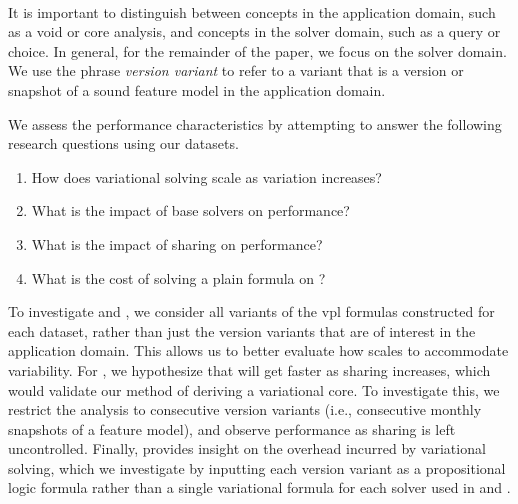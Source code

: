 ~\label{section:case-studies:experimental-methodology}

It is important to distinguish between concepts in the application domain, such
as a void or core analysis, and concepts in the solver domain, such as a query
or choice. In general, for the remainder of the paper, we focus on the solver
domain. We use the phrase \textit{version variant} to refer to a variant that is
a version or snapshot of a sound feature model in the application domain.

We assess the performance characteristics \vsat{} by attempting to answer the
following research questions using our datasets.
%
\begin{enumerate}%
\item[\resQ{1}] How does variational solving scale as variation increases?
\item[\resQ{2}] What is the impact of base solvers on performance?
\item[\resQ{3}] What is the impact of sharing on performance?
\item[\resQ{4}] What is the cost of solving a plain formula on \vsat{}?
\end{enumerate}

To investigate  and , we consider all variants of the \ac{vpl}
formulas constructed for each dataset, rather than just the version variants
that are of interest in the application domain. This allows us to better
evaluate how \vsat{} scales to accommodate variability.
%
For , we hypothesize that \vsat{} will get faster as sharing increases,
which would validate our method of deriving a variational core. To investigate
this, we restrict the analysis to consecutive version variants (i.e.,
consecutive monthly snapshots of a feature model), and observe performance
as sharing is left uncontrolled.
%
Finally,  provides insight on the overhead incurred by variational
solving, which we investigate by inputting each version variant as a
propositional logic formula rather than a single variational formula for each
solver used in  and .

